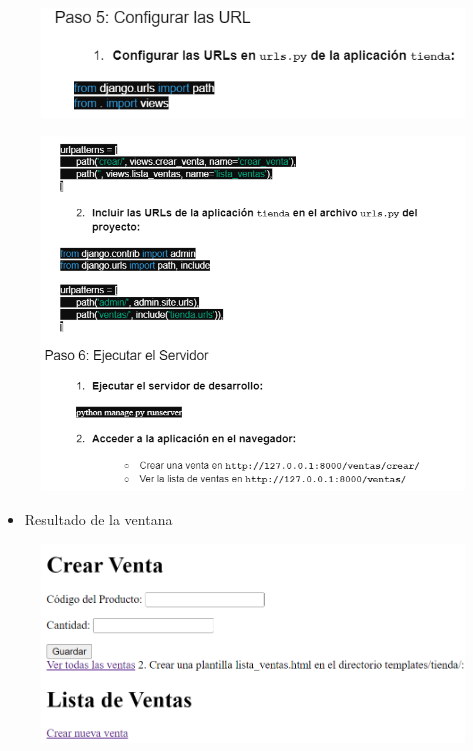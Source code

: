 \documentclass{article}
\begin{document}
	\begin{figure}[H]
		\centering
		\includegraphics[width=1.0\textwidth,keepaspectratio]{img/septimo.png}
	\end{figure}
	\begin{figure}[H]
		\centering
		\includegraphics[width=1.0\textwidth,keepaspectratio]{img/octavo.png}
	\end{figure}
	\begin{itemize}
		\item Resultado de la ventana
	\end{itemize}  
	\begin{figure}[H]
		\centering
		\includegraphics[width=1.0\textwidth,keepaspectratio]{img/Resultados1.png}
	\end{figure}
\end{document}
